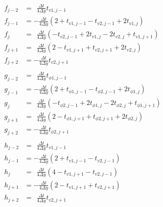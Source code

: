 \documentclass[a4paper]{PRseminar}
\begin{document}
	\begin{align}
		f_{j-2}&=\ \ \frac{\Delta t}{4\Delta y}t_{v1,j-1}\nonumber\\
		f_{j-1}&=-   \frac{\Delta t}{4\Delta y}\left(2+t_{v1,j-1}-t_{v2,j-1}+2t_{v1,j}\right)\nonumber\\
		f_{j  }&=\ \ \frac{\Delta t}{4\Delta y}\left(-t_{v2,j-1}+2t_{v1,j}-2t_{v2,j}+t_{v1,j+1}\right)       \\
		f_{j+1}&=\ \ \frac{\Delta t}{4\Delta y}\left(2-t_{v1,j+1}+t_{v2,j+1}+2t_{v2,j}\right)\nonumber\\
		f_{j+2}&=-   \frac{\Delta t}{4\Delta y}t_{v2,j+1}\nonumber \\\\
		g_{j-2}&=\ \ \frac{\Delta t}{4\Delta y}t_{\phi1,j-1}\nonumber\\
		g_{j-1}&=-   \frac{\Delta t}{4\Delta y}\left(2+t_{\phi1,j-1}-t_{\phi2,j-1}+2t_{\phi1,j}\right)\nonumber\\
		g_{j  }&=\ \ \frac{\Delta t}{4\Delta y}\left(-t_{\phi2,j-1}+2t_{\phi1,j}-2t_{\phi2,j}+t_{\phi1,j+1}\right)       \\
		g_{j+1}&=\ \ \frac{\Delta t}{4\Delta y}\left(2-t_{\phi1,j+1}+t_{\phi2,j+1}+2t_{\phi2,j}\right)\nonumber\\
		g_{j+2}&=-   \frac{\Delta t}{4\Delta y}t_{\phi2,j+1}\nonumber\\\\
		h_{j-2}&=\ \ \frac{\Delta t}{4\Delta y}t_{v1,j-1}\nonumber\\
		h_{j-1}&=-   \frac{\Delta t}{4\Delta y}\left(2+t_{v1,j-1}-t_{v2,j-1}\right)\nonumber\\
		h_{j  }&=\ \ \frac{\Delta t}{4\Delta y}\left(4-t_{v1,j+1}-t_{v2,j-1}\right)       \\
		h_{j+1}&=-   \frac{\Delta t}{4\Delta y}\left(2-t_{v1,j+1}+t_{v2,j+1}\right)\nonumber\\
		h_{j+2}&=\ \ \frac{\Delta t}{4\Delta y}t_{v2,j+1}\nonumber
	\end{align}
\end{document}
